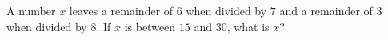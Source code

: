 A number $x$ leaves a remainder of $6$ when divided by $7$ and a remainder of $3$ when divided by $8$. If $x$ is between $15$ and $30$, what is $x$?
